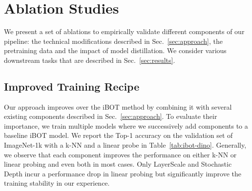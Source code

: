\section{Ablation Studies}
We present a set of ablations to empirically validate different components of our pipeline:
the technical modifications described in Sec.~\ref{sec:approach}, the pretraining data and the impact of model distillation. 
We consider various downstream tasks that are described in Sec.~\ref{sec:results}.

\subsection{Improved Training Recipe}
\label{sec:ablation-ibot}
Our approach improves over the iBOT method by combining it with several existing components described in Sec.~\ref{sec:approach}.
To evaluate their importance, we train multiple models where we successively add components to a baseline iBOT model.
We report the Top-1 accuracy on the validation set of ImageNet-1k with a k-NN and a linear probe in Table~\ref{tab:ibot-dino}. 
Generally, we observe that each component improves the performance on either k-NN or linear probing and even both in most cases.
Only LayerScale and Stochastic Depth incur a performance drop in linear probing but significantly improve the training stability in our experience.


